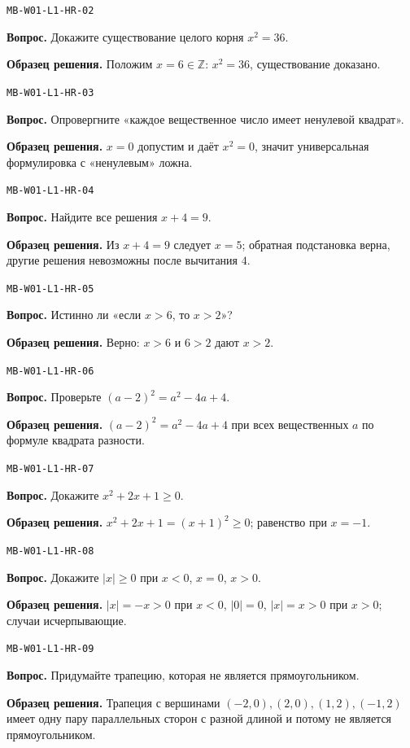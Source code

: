 \documentclass[11pt,a4paper,openany]{book}
\newcommand{\muid}[1]{\texttt{\footnotesize #1}}
\begin{document}
\noindent\muid{MB-W01-L1-HR-02}\par \textbf{Вопрос.} Докажите существование целого корня $x^2=36$.\par 
\textbf{Образец решения.} Положим $x=6\in\mathbb Z$: $x^2=36$, существование доказано.\medskip

\noindent\muid{MB-W01-L1-HR-03}\par \textbf{Вопрос.} Опровергните «каждое вещественное число имеет ненулевой квадрат».\par 
\textbf{Образец решения.} $x=0$ допустим и даёт $x^2=0$, значит универсальная формулировка с «ненулевым» ложна.\medskip

\noindent\muid{MB-W01-L1-HR-04}\par \textbf{Вопрос.} Найдите все решения $x+4=9$.\par 
\textbf{Образец решения.} Из $x+4=9$ следует $x=5$; обратная подстановка верна, другие решения невозможны после вычитания $4$.\medskip

\noindent\muid{MB-W01-L1-HR-05}\par \textbf{Вопрос.} Истинно ли «если $x>6$, то $x>2$»?\par 
\textbf{Образец решения.} Верно: $x>6$ и $6>2$ дают $x>2$.\medskip

\noindent\muid{MB-W01-L1-HR-06}\par \textbf{Вопрос.} Проверьте $(a-2)^2=a^2-4a+4$.\par 
\textbf{Образец решения.} $(a-2)^2=a^2-4a+4$ при всех вещественных $a$ по формуле квадрата разности.\medskip

\noindent\muid{MB-W01-L1-HR-07}\par \textbf{Вопрос.} Докажите $x^2+2x+1\ge0$.\par 
\textbf{Образец решения.} $x^2+2x+1=(x+1)^2\ge0$; равенство при $x=-1$.\medskip

\noindent\muid{MB-W01-L1-HR-08}\par \textbf{Вопрос.} Докажите $|x|\ge0$ при $x<0$, $x=0$, $x>0$.\par 
\textbf{Образец решения.} $|x|=-x>0$ при $x<0$, $|0|=0$, $|x|=x>0$ при $x>0$; случаи исчерпывающие.\medskip

\noindent\muid{MB-W01-L1-HR-09}\par \textbf{Вопрос.} Придумайте трапецию, которая не является прямоугольником.\par 
\textbf{Образец решения.} Трапеция с вершинами $(-2,0),(2,0),(1,2),(-1,2)$ имеет одну пару параллельных сторон с разной длиной и потому не является прямоугольником.\medskip
\end{document}
